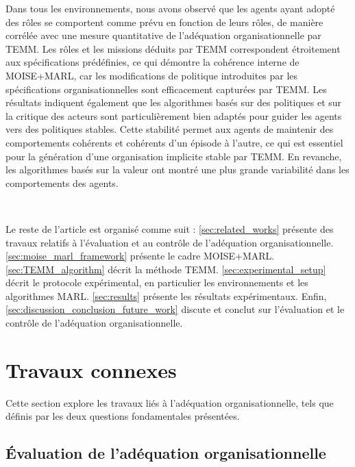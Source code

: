 Dans tous les environnements, nous avons observé que les agents ayant adopté des rôles se comportent comme prévu en fonction de leurs rôles, de manière corrélée avec une mesure quantitative de l'adéquation organisationnelle par TEMM. Les rôles et les missions déduits par TEMM correspondent étroitement aux spécifications prédéfinies, ce qui démontre la cohérence interne de MOISE+MARL, car les modifications de politique introduites par les spécifications organisationnelles sont efficacement capturées par TEMM.
Les résultats indiquent également que les algorithmes basés sur des politiques et sur la critique des acteurs sont particulièrement bien adaptés pour guider les agents vers des politiques stables. Cette stabilité permet aux agents de maintenir des comportements cohérents et cohérents d'un épisode à l'autre, ce qui est essentiel pour la génération d'une organisation implicite stable par TEMM. En revanche, les algorithmes basés sur la valeur ont montré une plus grande variabilité dans les comportements des agents.

\

\noindent Le reste de l'article est organisé comme suit : \autoref{sec:related_works} présente des travaux relatifs à l'évaluation et au contrôle de l'adéquation organisationnelle. \autoref{sec:moise_marl_framework} présente le cadre MOISE+MARL. \autoref{sec:TEMM_algorithm} décrit la méthode TEMM. \autoref{sec:experimental_setup} décrit le protocole expérimental, en particulier les environnements et les algorithmes MARL. \autoref{sec:results} présente les résultats expérimentaux. Enfin, \autoref{sec:discussion_conclusion_future_work} discute et conclut sur l'évaluation et le contrôle de l'adéquation organisationnelle.


\section{Travaux connexes}
\label{sec:travaux_connexes}

Cette section explore les travaux liés à l'adéquation organisationnelle, tels que définis par les deux questions fondamentales présentées.

\subsection{Évaluation de l'adéquation organisationnelle}

